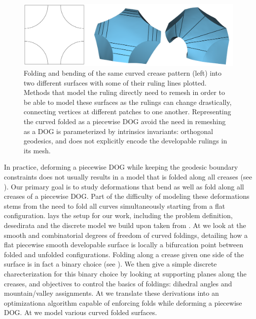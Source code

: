 \begin{figure} [h]
	\centering
	\includegraphics[width=\linewidth]{figures/rulings_problem_curve}
	\caption{Folding and bending of the same curved crease pattern (left) into two different surfaces with some of their ruling lines plotted. Methods that model the ruling directly need to remesh in order to be able to model these surfaces as the rulings can change drastically, connecting vertices at different patches to one another. Representing the curved folded as a piecewise DOG avoid the need in remeshing as a DOG is parameterized by intrinsics invariants: orthogonal geodesics, and does not explicitly encode the developable rulings in its mesh. }
	\label{fig:rulings_problem_curve}
\end{figure}

In practice, deforming a piecewise DOG while keeping the geodesic boundary constraints does not usually results in a model that is folded along all creases (see ). Our primary goal is to study deformations that bend as well as fold along all creases of a piecewise DOG. Part of the difficulty of modeling these deformations stems from the need to fold all curves simultaneously starting from a flat configuration.  lays the setup for our work, including the problem definition, desedirata and the discrete model we build upon taken from \cite{rabi18,rabi2018shape}. At  we look at the smooth and combinatorial degrees of freedom of curved foldings, detailing how a flat piecewise smooth developable surface is locally a bifurcation point between folded and unfolded configurations. Folding along a crease given one side of the surface is in fact a binary choice (see ). We then give a simple discrete charecterization for this binary choice by looking at supporting planes along the creases, and objectives to control the basics of foldings: dihedral angles and mountain/valley assignments. At  we translate these derivations into an optimizationa algorithm capable of enforcing folds while deforming a piecewise DOG. At  we model various curved folded surfaces.

